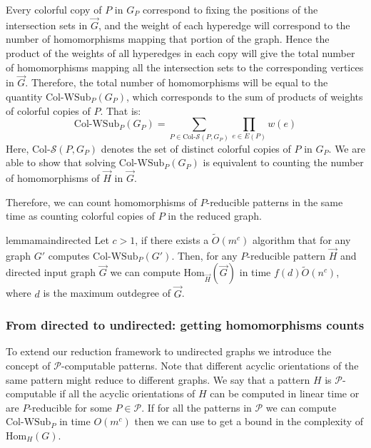 \documentclass[a4paper,UKenglish,cleveref, autoref, numberwithinsect, thm-restate]{lipics-v2021}
\newcommand{\reducible}[1]{${#1}$-reducible}
\newcommand{\computable}[1]{${#1}$-computable}
\newcommand{\reduced}[1]{G_{#1}}
\newcommand{\colSetSub}{\text{Col-}\cS}
\newcommand{\maxoutdeg}{d}
\newcommand{\WSub}[2]{\mathrm{\text{Col-WSub}}_{#2}(#1)}
\newcommand{\WSubNI}[1]{\mathrm{\text{Col-WSub}}_{#1}}
\newcommand{\Hom}[2]{\mathrm{Hom}_{#2}(#1)}
\newcommand{\cP}{\mathcal{P}}
\newcommand{\cS}{\mathcal{S}}
\begin{document}
	Every colorful copy of $P$ in $\reduced{P}$ correspond to fixing the positions of the intersection sets in $\vec{G}$, and the weight of each hyperedge will correspond to the number of homomorphisms mapping that portion of the graph. Hence the product of the weights of all hyperedges in each copy will give the total number of homomorphisms mapping all the intersection sets to the corresponding vertices in $\vec{G}$.
	Therefore, the total number of homomorphisms will be equal to the quantity $\WSub{\reduced{P}}{P}$, which corresponds to the sum of products of weights of colorful copies of $P$. That is:
	\begin{equation} \label{eq:wsub}
		\WSub{\reduced{P}}{P} = \sum_{P \in \colSetSub(P,\reduced{P})} \prod_{e\in E(P)} w(e)
	\end{equation}
Here, $\colSetSub(P,\reduced{P})$ denotes the set of distinct colorful copies of $P$ in $\reduced{P}$. We are able to show that solving $\WSub{\reduced{P}}{P}$ is equivalent to counting the number of homomorphisms of $\vec{H}$ in $\vec{G}$.

	Therefore, we can count homomorphisms of \reducible{P} patterns in the same time as counting colorful copies of $P$ in the reduced graph.
	
	\begin{restatable}{lemma}{maindirected} \label{lem:main_directed}
		Let $c>1$, if there exists a $\tilde{O}(m^{c})$ algorithm that for any graph $G'$ computes $\WSub{G'}{P}$. Then, for any \reducible{P} pattern $\vec{H}$ and directed input graph $\vec{G}$ we can compute $\Hom{\vec{G}}{\vec{H}}$ in time $f(\maxoutdeg)\tilde{O}(n^{c})$, where $\maxoutdeg$ is the maximum outdegree of $\vec{G}$.
	\end{restatable}

	\subsubsection{From directed to undirected: getting homomorphisms counts}
	
	To extend our reduction framework to undirected graphs we introduce the concept of \computable{\cP} patterns. Note that different acyclic orientations of the same pattern might reduce to different graphs. We say that a pattern $H$ is \computable{\cP} if all the acyclic orientations of $H$ can be computed in linear time or are \reducible{P} for some $P\in \cP$. If for all the patterns in $\cP$ we can compute $\WSubNI{P}$ in time $O(m^c)$ then we can use  to get a bound in the complexity of $\Hom{G}{H}$.
\end{document}
